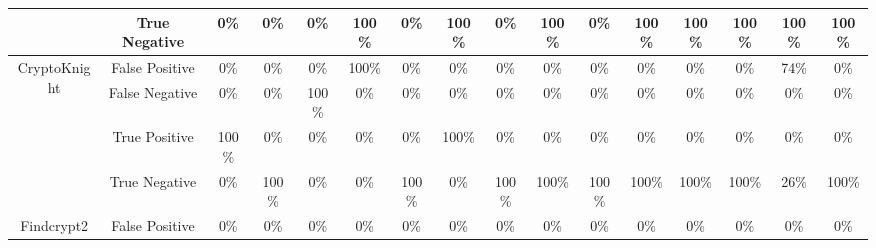 \begin{table}[htb]
\begin{adjustbox}{width=\textwidth}
\begin{tabular}{cc|ccccccccc|ccccc}
\multicolumn{1}{c|}{} & \multicolumn{1}{c||}{True Negative} & \multicolumn{1}{c|}{0\%} & \multicolumn{1}{c|}{0\%} & \multicolumn{1}{c|}{0\%} & \multicolumn{1}{c|}{100\%} & \multicolumn{1}{c|}{0\%} & \multicolumn{1}{c|}{100\%} & \multicolumn{1}{c|}{0\%} & \multicolumn{1}{c|}{100\%} & \multicolumn{1}{c|}{0\%} & \multicolumn{1}{c|}{100\%} & \multicolumn{1}{c|}{100\%} & \multicolumn{1}{c|}{100\%} & \multicolumn{1}{c|}{100\%} & 100\% \\ \hline
\multicolumn{1}{c|}{\multirow{4}{*}{CryptoKnight}} & \multicolumn{1}{c||}{False Positive} & \multicolumn{1}{c|}{0\%} & \multicolumn{1}{c|}{0\%} & \multicolumn{1}{c|}{0\%} & \multicolumn{1}{c|}{100\%} & \multicolumn{1}{c|}{0\%} & \multicolumn{1}{c|}{0\%} & \multicolumn{1}{c|}{0\%} & \multicolumn{1}{c|}{0\%} & \multicolumn{1}{c|}{0\%} & \multicolumn{1}{c|}{0\%} & \multicolumn{1}{c|}{0\%} & \multicolumn{1}{c|}{0\%} & \multicolumn{1}{c|}{74\%} & 0\% \\ \cline{2-16} 
\multicolumn{1}{c|}{} & \multicolumn{1}{c||}{False Negative} & \multicolumn{1}{c|}{0\%} & \multicolumn{1}{c|}{0\%} & \multicolumn{1}{c|}{100\%} & \multicolumn{1}{c|}{0\%} & \multicolumn{1}{c|}{0\%} & \multicolumn{1}{c|}{0\%} & \multicolumn{1}{c|}{0\%} & \multicolumn{1}{c|}{0\%} & \multicolumn{1}{c|}{0\%} & \multicolumn{1}{c|}{0\%} & \multicolumn{1}{c|}{0\%} & \multicolumn{1}{c|}{0\%} & \multicolumn{1}{c|}{0\%} & 0\% \\ \cline{2-16} 
\multicolumn{1}{c|}{} & \multicolumn{1}{c||}{True Positive} & \multicolumn{1}{c|}{100\%} & \multicolumn{1}{c|}{0\%} & \multicolumn{1}{c|}{0\%} & \multicolumn{1}{c|}{0\%} & \multicolumn{1}{c|}{0\%} & \multicolumn{1}{c|}{100\%} & \multicolumn{1}{c|}{0\%} & \multicolumn{1}{c|}{0\%} & \multicolumn{1}{c|}{0\%} & \multicolumn{1}{c|}{0\%} & \multicolumn{1}{c|}{0\%} & \multicolumn{1}{c|}{0\%} & \multicolumn{1}{c|}{0\%} & 0\% \\ \cline{2-16} 
\multicolumn{1}{c|}{} & \multicolumn{1}{c||}{True Negative} & \multicolumn{1}{c|}{0\%} & \multicolumn{1}{c|}{100\%} & \multicolumn{1}{c|}{0\%} & \multicolumn{1}{c|}{0\%} & \multicolumn{1}{c|}{100\%} & \multicolumn{1}{c|}{0\%} & \multicolumn{1}{c|}{100\%} & \multicolumn{1}{c|}{100\%} & \multicolumn{1}{c|}{100\%} & \multicolumn{1}{c|}{100\%} & \multicolumn{1}{c|}{100\%} & \multicolumn{1}{c|}{100\%} & \multicolumn{1}{c|}{26\%} & 100\% \\ \hline
\multicolumn{1}{c|}{\multirow{4}{*}{Findcrypt2}} & \multicolumn{1}{c||}{False Positive} & \multicolumn{1}{c|}{0\%} & \multicolumn{1}{c|}{0\%} & \multicolumn{1}{c|}{0\%} & \multicolumn{1}{c|}{0\%} & \multicolumn{1}{c|}{0\%} & \multicolumn{1}{c|}{0\%} & \multicolumn{1}{c|}{0\%} & \multicolumn{1}{c|}{0\%} & \multicolumn{1}{c|}{0\%} & \multicolumn{1}{c|}{0\%} & \multicolumn{1}{c|}{0\%} & \multicolumn{1}{c|}{0\%} & \multicolumn{1}{c|}{0\%} & 0\% \\ \cline{2-16} 

\end{tabular}
\end{adjustbox}
\end{table}
